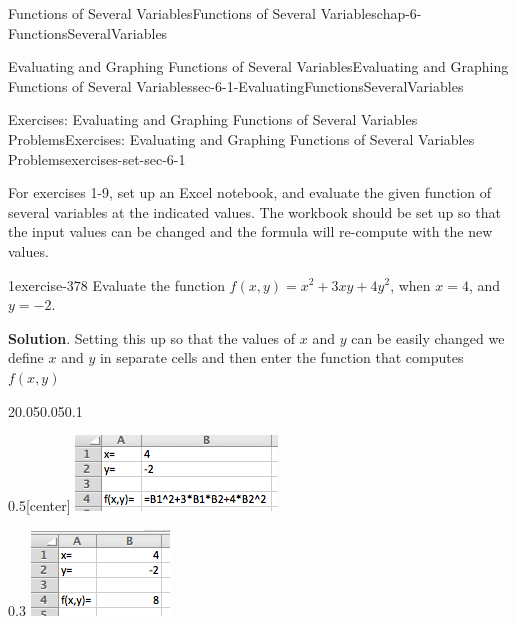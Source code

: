 \documentclass[oneside,10pt,]{book}
\numberwithin{equation}{section}
\begin{document}
\begin{chapterptx}{Functions of Several Variables}{}{Functions of Several Variables}{}{}{chap-6-FunctionsSeveralVariables}
\begin{sectionptx}{Evaluating and Graphing Functions of Several Variables}{}{Evaluating and Graphing Functions of Several Variables}{}{}{sec-6-1-EvaluatingFunctionsSeveralVariables}
\begin{exercises-subsection-numberless}{Exercises: Evaluating and Graphing Functions of Several Variables Problems}{}{Exercises: Evaluating and Graphing Functions of Several Variables Problems}{}{}{exercises-set-sec-6-1}
\par\medskip\noindent%
\hypertarget{exercisegroup-24}{}%
\hypertarget{p-2146}{}%
For exercises 1-9, set up an Excel notebook, and evaluate the given function of several variables at the indicated values.  The workbook should be set up so that the input values can be changed and the formula will re-compute with the new values.%
\begin{exercisegroup}
\begin{divisionexerciseeg}{1}{}{}{exercise-378}%
\hypertarget{p-2147}{}%
Evaluate the function \(f(x,y)=x^2+3xy+4y^2\), when \(x=4\), and \(y=-2\).%
\par\smallskip%
\noindent\textbf{Solution}.\hypertarget{solution-190}{}\quad%
\hypertarget{p-2148}{}%
Setting this up so that the values of \(x\) and \(y\) can be easily changed we define \(x\) and \(y\) in separate cells and then enter the function that computes \(f(x,y)\)%
\begin{sidebyside}{2}{0.05}{0.05}{0.1}%
\begin{sbspanel}{0.5}[center]%
\includegraphics[width=1\linewidth]{images/sec6-1-sol1a.png}
\end{sbspanel}%
\begin{sbspanel}{0.3}%
\includegraphics[width=1\linewidth]{images/sec6-1-sol1b.png}

\end{sbspanel}
\end{sidebyside}
\end{divisionexerciseeg}
\end{exercisegroup}
\end{exercises-subsection-numberless}
\end{sectionptx}
\end{chapterptx}
\end{document}
